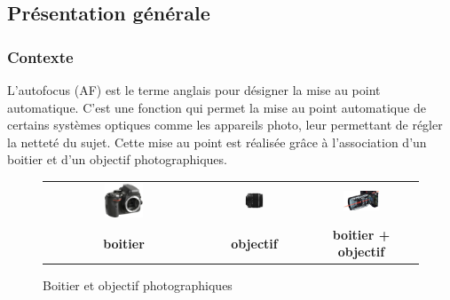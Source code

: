 
\vspace{-1cm}
\subsection{Présentation générale}
\vspace{-.5cm}
\subsubsection{Contexte}\label{contexte}


L'autofocus (AF) est le terme anglais pour désigner la mise au point
automatique. C'est une fonction qui permet la mise au point automatique
de certains systèmes optiques comme les appareils photo, leur permettant
de régler la netteté du sujet. Cette mise au point est réalisée grâce à
l'association d'un boitier et d'un objectif photographiques.

\begin{figure}[!htb]
\begin{center}
\begin{tabular}{ccc}
\includegraphics[width=0.25\textwidth]{images/image6.jpeg}
&
\includegraphics[width=0.21\textwidth]{images/image7.png}
&
\includegraphics[width=0.35\textwidth]{images/image8.png}
\\
\textbf{boitier}& \textbf{objectif}& \textbf{boitier + objectif}
\end{tabular}
\caption{Boitier et objectif photographiques \label{fig1}}
\end{center}
\end{figure}
\vspace{-.5cm}


